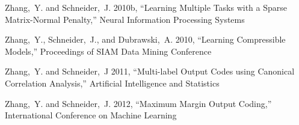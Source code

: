 \documentclass[useAMS,usenatbib,tightenlines,11pt,preprint]{aastex}
\begin{document}
\begin{thebibliography}{99}
Zhang,~Y. and Schneider,~J. 2010b,
``Learning Multiple Tasks with a Sparse Matrix-Normal Penalty,''
Neural Information Processing Systems

Zhang,~Y., Schneider,~J., and Dubrawski,~A. 2010,
``Learning Compressible Models,'' Proceedings of SIAM Data Mining Conference

Zhang,~Y. and Schneider,~J 2011, ``Multi-label Output Codes using Canonical Correlation
Analysis,'' Artificial Intelligence and Statistics

Zhang,~Y. and Schneider,~J. 2012, ``Maximum Margin Output Coding,''
International Conference on Machine Learning

\end{thebibliography} 
\label{lastpage}
\end{document}
